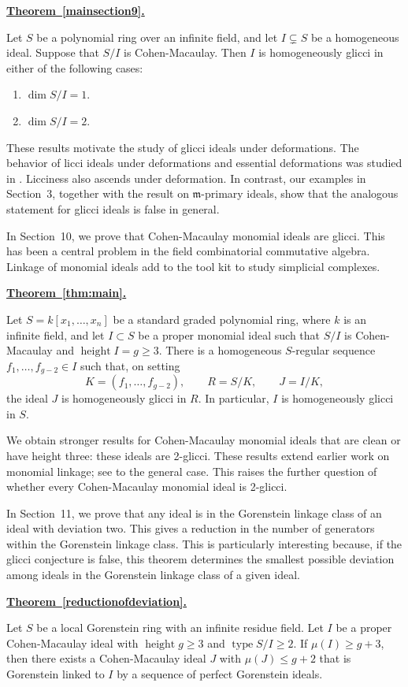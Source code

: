 \documentclass[11pt,letterpaper]{amsart}
\DeclareMathOperator{\type}{type}
\DeclareMathOperator{\height}{height}
\theoremstyle{plain}
\theoremstyle{definition}
\theoremstyle{remark}
\newenvironment{recalledtheorem}[1]
{%
  \par\vspace{7pt}
  \noindent
  \textbf{\hyperref[#1]{Theorem~\ref*{#1}.}}
  \ \itshape
}
{%
  \par\vspace{7pt}
}
\begin{document}
\begin{recalledtheorem}{mainsection9}
Let $S$ be a polynomial ring over an infinite field, and let $I\subsetneq S$ be a homogeneous ideal. Suppose that $S/I$ is Cohen-Macaulay.
Then $I$ is homogeneously glicci in either of the following cases:
\begin{enumerate}
\item[$(a)$] $\dim S/I=1$.
\item[$(b)$] $\dim S/I=2$.
\end{enumerate}
\end{recalledtheorem}

 These results motivate the study of glicci ideals under deformations. The behavior of licci ideals under deformations and essential deformations was studied in \cite{huneke1987structure}. Licciness also ascends under deformation. In contrast, our examples in Section~3, together with the result on $\mathfrak m$-primary ideals, show that the analogous statement for glicci ideals is false in general. 

In Section~10, we prove that Cohen-Macaulay monomial ideals are glicci. This has been a central problem in the field combinatorial commutative algebra. Linkage of monomial ideals add to the tool kit to study simplicial complexes.  
\begin{recalledtheorem}{thm:main}
Let $S=k[x_1,\ldots,x_n]$ be a standard graded polynomial ring, where $k$ is an infinite field,
and let $I\subset S$ be a proper monomial ideal such that $S/I$ is
Cohen-Macaulay and $\height I=g\geq3$. There is a homogeneous
$S$-regular sequence $f_1,\ldots,f_{g-2}\in I$ such that, on setting
\[
 K=(f_1,\ldots,f_{g-2}),\qquad R=S/K,\qquad J=I/K,
\]
the ideal $J$ is homogeneously glicci in $R$. In particular, $I$ is
homogeneously glicci in $S$.  
\end{recalledtheorem}

We obtain stronger results for Cohen-Macaulay monomial ideals that are clean or have height three: these
ideals are 2-glicci. These results extend earlier work on monomial linkage; see \cite{migliore2002monomial, migliore2013glicci, faridi2025polarization, mantero2025slightly, lyle2025ordinary, mudrak2026zero} to the general case. This raises the further question of whether every Cohen-Macaulay monomial ideal is 2-glicci.

In Section~11, we prove that any ideal is in the  Gorenstein linkage class of an ideal with deviation two. This gives a reduction in the number of generators
within the Gorenstein linkage class. This is particularly interesting because, if the glicci conjecture is false, this theorem determines the smallest possible deviation among ideals in the Gorenstein linkage class of a given ideal.
\begin{recalledtheorem}{reductionofdeviation}
    Let $S$ be a local Gorenstein ring with an infinite residue field. Let $I$ be a proper Cohen-Macaulay ideal with $\height g\ge 3$ and $\type S/I\ge 2$. If $\mu(I)\ge g+3$, then there exists a Cohen-Macaulay ideal $J$ with $\mu(J)\le g+2$ that is Gorenstein linked to $I$ by a sequence
of perfect Gorenstein ideals.
\end{recalledtheorem}
\end{document}
